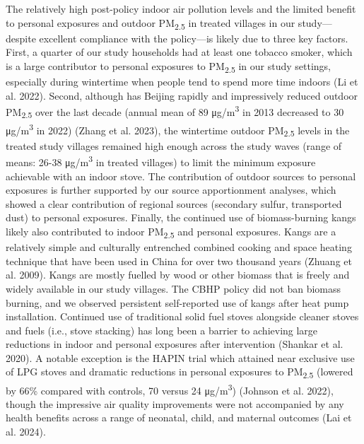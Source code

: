 \documentclass[
  letterpaper,
  DIV=11,
  numbers=noendperiod]{scrartcl}
\begin{document}
The relatively high post-policy indoor air pollution levels and the
limited benefit to personal exposures and outdoor PM\textsubscript{2.5}
in treated villages in our study---despite excellent compliance with the
policy---is likely due to three key factors. First, a quarter of our
study households had at least one tobacco smoker, which is a large
contributor to personal exposures to PM\textsubscript{2.5} in our study
settings, especially during wintertime when people tend to spend more
time indoors (Li et al. 2022). Second, although has Beijing rapidly and
impressively reduced outdoor PM\textsubscript{2.5} over the last decade
(annual mean of 89 μg/m\textsuperscript{3} in 2013 decreased to 30
μg/m\textsuperscript{3} in 2022) (Zhang et al. 2023), the wintertime
outdoor PM\textsubscript{2.5} levels in the treated study villages
remained high enough across the study waves (range of means: 26-38
μg/m\textsuperscript{3} in treated villages) to limit the minimum
exposure achievable with an indoor stove. The contribution of outdoor
sources to personal exposures is further supported by our source
apportionment analyses, which showed a clear contribution of regional
sources (secondary sulfur, transported dust) to personal exposures.
Finally, the continued use of biomass-burning kangs likely also
contributed to indoor PM\textsubscript{2.5} and personal exposures.
Kangs are a relatively simple and culturally entrenched combined cooking
and space heating technique that have been used in China for over two
thousand years (Zhuang et al. 2009). Kangs are mostly fuelled by wood or
other biomass that is freely and widely available in our study villages.
The CBHP policy did not ban biomass burning, and we observed persistent
self-reported use of kangs after heat pump installation. Continued use
of traditional solid fuel stoves alongside cleaner stoves and fuels
(i.e., stove stacking) has long been a barrier to achieving large
reductions in indoor and personal exposures after intervention (Shankar
et al. 2020). A notable exception is the HAPIN trial which attained near
exclusive use of LPG stoves and dramatic reductions in personal
exposures to PM\textsubscript{2.5} (lowered by 66\% compared with
controls, 70 versus 24 μg/m\textsuperscript{3}) (Johnson et al. 2022),
though the impressive air quality improvements were not accompanied by
any health benefits across a range of neonatal, child, and maternal
outcomes (Lai et al. 2024).
\end{document}
